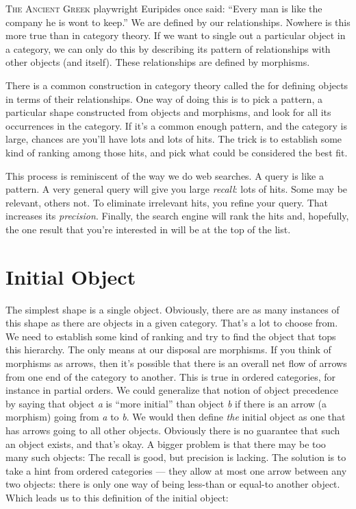 \lettrine[lhang=0.17]{T}{he Ancient Greek} playwright Euripides once said: ``Every man is like
the company he is wont to keep.'' We are defined by our relationships.
Nowhere is this more true than in category theory. If we want to single
out a particular object in a category, we can only do this by describing
its pattern of relationships with other objects (and itself). These
relationships are defined by morphisms.

There is a common construction in category theory called the
 for defining objects in terms of their
relationships. One way of doing this is to pick a pattern, a particular
shape constructed from objects and morphisms, and look for all its
occurrences in the category. If it's a common enough pattern, and the
category is large, chances are you'll have lots and lots of hits. The
trick is to establish some kind of ranking among those hits, and pick
what could be considered the best fit.

This process is reminiscent of the way we do web searches. A query is
like a pattern. A very general query will give you large \emph{recall}:
lots of hits. Some may be relevant, others not. To eliminate irrelevant
hits, you refine your query. That increases its \emph{precision}.
Finally, the search engine will rank the hits and, hopefully, the one
result that you're interested in will be at the top of the list.

\section{Initial Object}\label{initial-object}

The simplest shape is a single object. Obviously, there are as many
instances of this shape as there are objects in a given category. That's
a lot to choose from. We need to establish some kind of ranking and try
to find the object that tops this hierarchy. The only means at our
disposal are morphisms. If you think of morphisms as arrows, then it's
possible that there is an overall net flow of arrows from one end of the
category to another. This is true in ordered categories, for instance in
partial orders. We could generalize that notion of object precedence by
saying that object \emph{a} is ``more initial'' than object \emph{b} if
there is an arrow (a morphism) going from \emph{a} to \emph{b}. We would
then define \emph{the} initial object as one that has arrows going to
all other objects. Obviously there is no guarantee that such an object
exists, and that's okay. A bigger problem is that there may be too many
such objects: The recall is good, but precision is lacking. The solution
is to take a hint from ordered categories --- they allow at most one
arrow between any two objects: there is only one way of being less-than
or equal-to another object. Which leads us to this definition of the
initial object:

